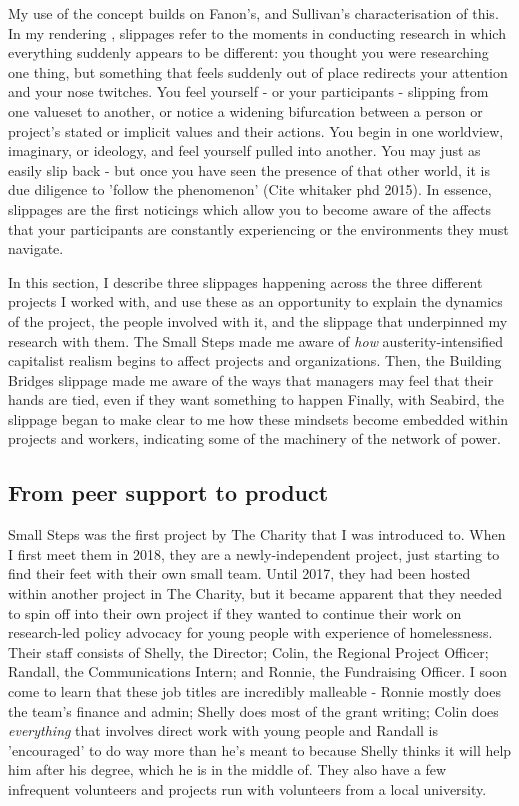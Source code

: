 My use of the concept builds on Fanon's, and Sullivan's characterisation of this. In my rendering \citep{cutting_making_2021}, slippages refer to the moments in conducting research in which everything suddenly appears to be different: you thought you were researching one thing, but something that feels suddenly out of place redirects your attention and your nose twitches. You feel yourself - or your participants - slipping from one valueset to another, or notice a widening bifurcation between a person or project's stated or implicit values and their actions. You begin in one worldview, imaginary, or ideology, and feel yourself pulled into another. You may just as easily slip back - but once you have seen the presence of that other world, it is due diligence to 'follow the phenomenon' (Cite whitaker phd 2015). In essence, slippages are the first noticings which allow you to become aware of the affects that your participants are constantly experiencing or the environments they must navigate.

In this section, I describe three slippages happening across the three different projects I worked with, and use these as an opportunity to explain the dynamics of the project, the people involved with it, and the slippage that underpinned my research with them. The Small Steps made me aware of \textit{how} austerity-intensified capitalist realism begins to affect projects and organizations. Then, the Building Bridges slippage made me aware of the ways that  managers may feel that their hands are tied, even if they want something to happen Finally, with Seabird, the slippage began to make clear to me how these mindsets  become embedded within projects and workers, indicating some of the machinery of the network of power. 

\subsection{From peer support to product}
Small Steps was the first project by The Charity that I was introduced to. When I first meet them in 2018, they are a newly-independent project, just starting to find their feet with their own small team. Until 2017, they had been hosted within another project in The Charity, but it became apparent that they needed to spin off into their own project if they wanted to continue their work on research-led policy advocacy for young people with experience of homelessness. Their staff consists of Shelly, the Director; Colin, the Regional Project Officer; Randall, the Communications Intern; and Ronnie, the Fundraising Officer. I soon come to learn that these job titles are incredibly malleable - Ronnie mostly does the team's finance and admin; Shelly does most of the grant writing; Colin does \textit{everything} that involves direct work with young people and Randall is 'encouraged' to do way more than he's meant to because Shelly thinks it will help him after his degree, which he is in the middle of. They also have a few infrequent volunteers and projects run with volunteers from a local university. 

